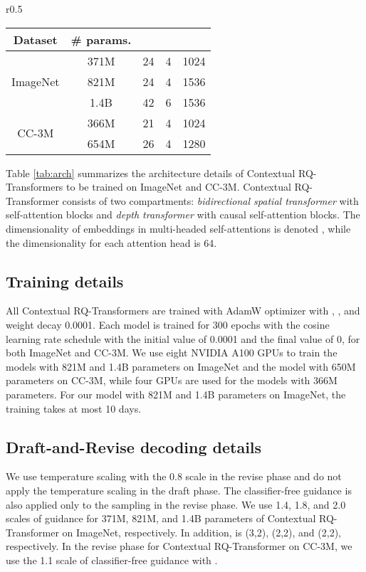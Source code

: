 \documentclass{article}
\begin{document}
\begin{wraptable}{r}{0.5\textwidth}
\small
\centering\caption{Architecture details of Contextual RQ-Transformer for ImageNet and CC-3M.}
\label{tab:arch}
\begin{tabular}{ccccc}
\toprule
Dataset & \# params. &  &  & \\ \hline
\multirow{3}{*}{ImageNet} & 371M & 24 & 4 & 1024 \\
& 821M & 24 & 4 & 1536 \\
& 1.4B & 42 & 6 & 1536 \\ \hline
\multirow{2}{*}{CC-3M}& 366M & 21 & 4 & 1024 \\
& 654M & 26 & 4 & 1280 \\
\bottomrule
\end{tabular}
\end{wraptable}

Table \ref{tab:arch} summarizes the architecture details of Contextual RQ-Transformers to be trained on ImageNet and CC-3M. Contextual RQ-Transformer consists of two compartments: \emph{bidirectional spatial transformer} with  self-attention blocks and \emph{depth transformer} with  causal self-attention blocks. 
The dimensionality of embeddings in multi-headed self-attentions is denoted , while the dimensionality for each attention head is 64.


\subsection{Training details}

All Contextual RQ-Transformers are trained with AdamW optimizer with , , and weight decay 0.0001. 
Each model is trained for 300 epochs with the cosine learning rate schedule with the initial value of 0.0001 and the final value of 0, for both ImageNet and CC-3M. 
We use eight NVIDIA A100 GPUs to train the models with 821M and 1.4B parameters on ImageNet and the model with 650M parameters on CC-3M, while four GPUs are used for the models with 366M parameters.
For our model with 821M and 1.4B parameters on ImageNet, the training takes at most 10 days.

\subsection{Draft-and-Revise decoding details}
We use temperature scaling with the 0.8 scale in the revise phase and do not apply the temperature scaling in the draft phase.
The classifier-free guidance is also applied only to the sampling in the revise phase.
We use 1.4, 1.8, and 2.0 scales of guidance for 371M, 821M, and 1.4B parameters of Contextual RQ-Transformer on ImageNet, respectively.
In addition,  is (3,2), (2,2), and (2,2), respectively.
In the revise phase for Contextual RQ-Transformer on CC-3M, we use the 1.1 scale of classifier-free guidance with .
\end{document}
